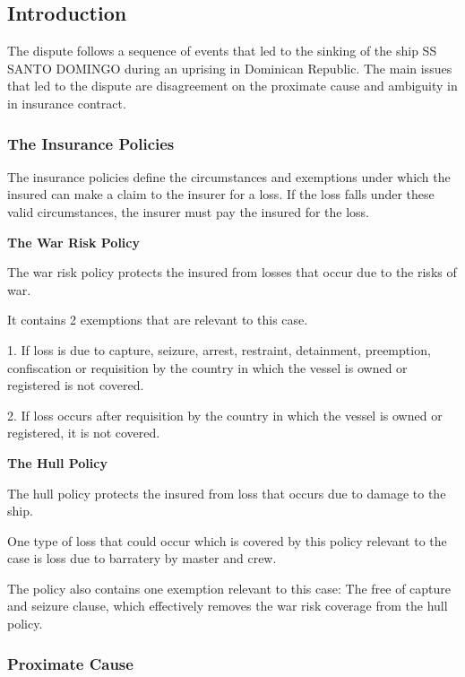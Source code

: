 \subsection{Introduction}

The dispute follows a sequence of events that led to the sinking of the ship SS SANTO DOMINGO during an uprising in Dominican Republic.
The main issues that led to the dispute are disagreement on the proximate cause and ambiguity in in insurance contract.


\subsubsection{The Insurance Policies}

The insurance policies define the circumstances and exemptions under which the insured can make a claim to the insurer for a loss. If the loss falls under these valid circumstances, the insurer must pay the insured for the loss.

\textbf{The War Risk Policy}

The war risk policy protects the insured from losses that occur due to the risks of war.

It contains 2 exemptions that are relevant to this case.

1. If loss is due to capture, seizure, arrest, restraint, detainment, preemption, confiscation or requisition by the country in which the vessel is owned or registered is not covered.

2. If loss occurs after requisition by the country in which the vessel is owned or registered, it is not covered.

\textbf{The Hull Policy}

The hull policy protects the insured from loss that occurs due to damage to the ship.

One type of loss that could occur which is covered by this policy relevant to the case is loss due to barratery by master and crew.

The policy also contains one exemption relevant to this case: The free of capture and seizure clause, which effectively removes the war risk coverage from the hull policy.  

\subsubsection{Proximate Cause}

